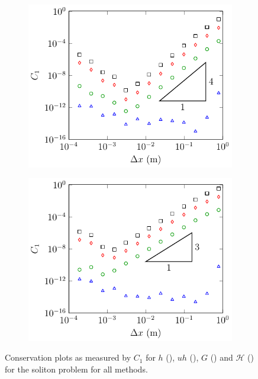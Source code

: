 \begin{figure}
\begin{subfigure}{0.5\textwidth}
		\vspace{0.5cm}
	\end{subfigure}
	\begin{subfigure}{0.5\textwidth}
		\includegraphics[width=\textwidth]{./chp5/figures/Analytic/Soliton/C1/D.pdf}
		\vspace{0.5cm}
	\end{subfigure}%
	\begin{subfigure}{0.5\textwidth}
		\includegraphics[width=\textwidth]{./chp5/figures/Analytic/Soliton/C1/W.pdf}
		\vspace{0.5cm}
	\end{subfigure}
	\caption{Conservation plots as measured by $C_1$ for $h$ (), $uh$ (), $G$ () and $\mathcal{H}$ () for the soliton problem for all methods.}
	\label{fig:SolitonC1All}
\end{figure}

